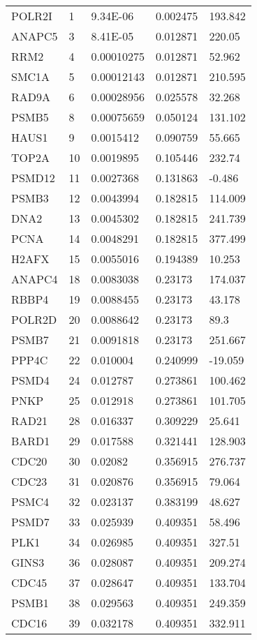 \begin{longtable}{>{\baselineskip=16pt}p{3cm} >{\baselineskip=16pt}p{1cm}  >{\baselineskip=16pt}p{3cm}   >{\baselineskip=16pt}p{3cm} >{\baselineskip=16pt}p{3cm}}
POLR2I & 1 & 9.34E-06 & 0.002475 & 193.842 \\
ANAPC5 & 3 & 8.41E-05 & 0.012871 & 220.05 \\
RRM2 & 4 & 0.00010275 & 0.012871 & 52.962 \\
SMC1A & 5 & 0.00012143 & 0.012871 & 210.595 \\
RAD9A & 6 & 0.00028956 & 0.025578 & 32.268 \\
PSMB5 & 8 & 0.00075659 & 0.050124 & 131.102 \\
HAUS1 & 9 & 0.0015412 & 0.090759 & 55.665 \\
TOP2A & 10 & 0.0019895 & 0.105446 & 232.74 \\
PSMD12 & 11 & 0.0027368 & 0.131863 & -0.486 \\
PSMB3 & 12 & 0.0043994 & 0.182815 & 114.009 \\
DNA2 & 13 & 0.0045302 & 0.182815 & 241.739 \\
PCNA & 14 & 0.0048291 & 0.182815 & 377.499 \\
H2AFX & 15 & 0.0055016 & 0.194389 & 10.253 \\
ANAPC4 & 18 & 0.0083038 & 0.23173 & 174.037 \\
RBBP4 & 19 & 0.0088455 & 0.23173 & 43.178 \\
POLR2D & 20 & 0.0088642 & 0.23173 & 89.3 \\
PSMB7 & 21 & 0.0091818 & 0.23173 & 251.667 \\
PPP4C & 22 & 0.010004 & 0.240999 & -19.059 \\
PSMD4 & 24 & 0.012787 & 0.273861 & 100.462 \\
PNKP & 25 & 0.012918 & 0.273861 & 101.705 \\
RAD21 & 28 & 0.016337 & 0.309229 & 25.641 \\
BARD1 & 29 & 0.017588 & 0.321441 & 128.903 \\
CDC20 & 30 & 0.02082 & 0.356915 & 276.737 \\
CDC23 & 31 & 0.020876 & 0.356915 & 79.064 \\
PSMC4 & 32 & 0.023137 & 0.383199 & 48.627 \\
PSMD7 & 33 & 0.025939 & 0.409351 & 58.496 \\
PLK1 & 34 & 0.026985 & 0.409351 & 327.51 \\
GINS3 & 36 & 0.028087 & 0.409351 & 209.274 \\
CDC45 & 37 & 0.028647 & 0.409351 & 133.704 \\
PSMB1 & 38 & 0.029563 & 0.409351 & 249.359 \\
CDC16 & 39 & 0.032178 & 0.409351 & 332.911 \\

\end{longtable}
